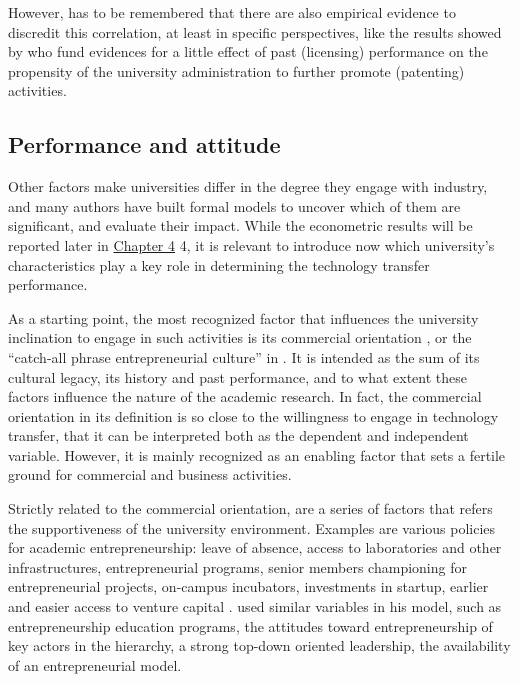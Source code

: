 However, has to be remembered that there are also empirical evidence to discredit this correlation, at least in specific perspectives, like the results showed by \citet{Thursby2002} who fund evidences for a little effect of past (licensing) performance on the propensity of the university administration to further promote (patenting) activities.


\subsection{Performance and attitude}

Other factors make universities differ in the degree they engage with industry, and many authors have built formal models to uncover which of them are significant, and evaluate their impact. While the econometric results will be reported later in \hyperref[Chapter4]{Chapter 4} 4, it is relevant to introduce now which university's characteristics play a key role in determining the technology transfer performance.

As a starting point, the most recognized factor that influences the university inclination to engage in such activities is its commercial orientation \citep{DEste2007}, or the \enquote{catch-all phrase entrepreneurial culture} in \citet{OwenSmith2001}. It is intended as the sum of its cultural legacy, its history and past performance, and to what extent these factors influence the nature of the academic research. In fact, the commercial orientation in its definition is so close to the willingness to engage in technology transfer, that it can be interpreted both as the dependent and independent variable. However, it is mainly recognized as an enabling factor that sets a fertile ground for commercial and business activities. 

Strictly related to the commercial orientation, are a series of factors that refers the supportiveness of the university environment. Examples are various policies for academic entrepreneurship: leave of absence, access to laboratories and other infrastructures, entrepreneurial programs, senior members championing for entrepreneurial projects, on-campus incubators, investments in startup, earlier and easier access to venture capital \citep{Baldini2007}. \citet{Guerrero2014} used similar variables in his model, such as entrepreneurship education programs, the attitudes toward entrepreneurship of key actors in the hierarchy, a strong top-down oriented leadership, the availability of an entrepreneurial model.

